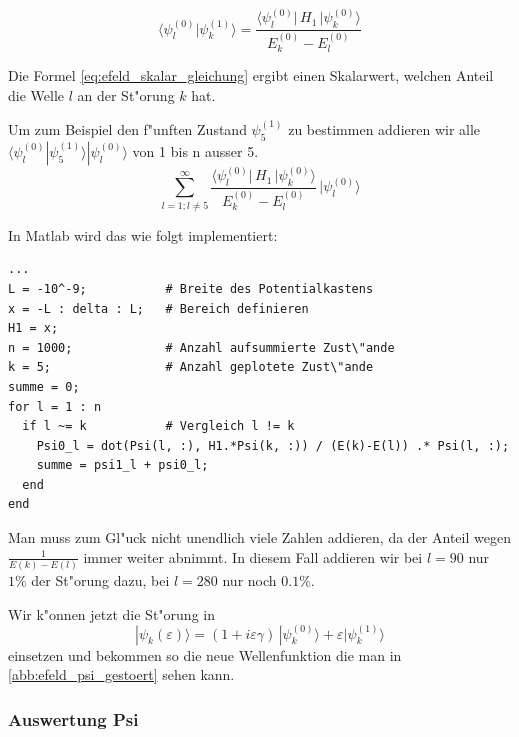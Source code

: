 \begin{refsection}
\begin{equation}
  \label{eq:efeld_skalar_gleichung}
  \langle\psi_l^{(0)}|\psi_k^{(1)}\rangle
      =
  \frac{\langle \psi_l^{(0)}|\, H_1 \,|\psi_k^{(0)}\rangle}{E_k^{(0)}-E_l^{(0)}}
\end{equation}

Die Formel \ref{eq:efeld_skalar_gleichung} ergibt einen Skalarwert, welchen Anteil die Welle $l$ an der St"orung $k$ hat.

Um zum Beispiel den f"unften Zustand $\psi_5^{(1)}$ zu bestimmen addieren wir alle 
$\langle\psi_l^{(0)}|\psi_5^{(1)}\rangle|\psi_l^{(0)}\rangle$
 von 1 bis n ausser 5.
\begin{equation}
  \sum_{l=1 ; l\ne 5}^{\infty}
    \frac{\langle \psi_l^{(0)}|\, H_1 \,|\psi_k^{(0)}\rangle}{E_k^{(0)}-E_l^{(0)}}
        \,
    |\psi_l^{(0)}\rangle
\end{equation}

In Matlab wird das wie folgt implementiert:
\begin{lstlisting}[style=Matlab]
...
L = -10^-9;           # Breite des Potentialkastens
x = -L : delta : L;   # Bereich definieren
H1 = x;               
n = 1000;             # Anzahl aufsummierte Zust\"ande
k = 5;                # Anzahl geplotete Zust\"ande
summe = 0;
for l = 1 : n
  if l ~= k           # Vergleich l != k
    Psi0_l = dot(Psi(l, :), H1.*Psi(k, :)) / (E(k)-E(l)) .* Psi(l, :);
    summe = psi1_l + psi0_l;
  end
end
\end{lstlisting} %

Man muss zum Gl"uck nicht unendlich viele Zahlen addieren, da der Anteil wegen $\frac{1}{E(k)-E(l)}$ immer weiter abnimmt.
In diesem Fall addieren wir bei $l=90$ nur $1\%$ der St"orung dazu, bei $l=280$ nur noch $0.1\%$.

Wir k"onnen jetzt die St"orung in 
\begin{equation}
|\psi_k(\varepsilon)\rangle
=
(1+i\varepsilon \gamma)
\,|\psi_k^{(0)}\rangle
+
\varepsilon|\psi_k^{(1)}\rangle
\end{equation}
einsetzen und bekommen so die neue Wellenfunktion die man in \ref{abb:efeld_psi_gestoert} sehen kann.

\subsubsection{Auswertung Psi}


\end{refsection}
